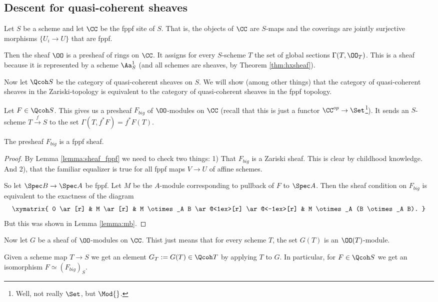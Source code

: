 \documentclass[11pt, english]{article}
\begin{document}
\subsection{Descent for quasi-coherent sheaves}

Let $S$ be a scheme and let $\CC$ be the fppf site of $S$. That is, the objects of $\CC$ are $S$-maps and the coverings are jointly surjective morphisms $\{U_i \to U\}$ that are fppf.

Then the sheaf $\OO$ is a presheaf of rings on $\CC$. It assigns for every $S$-scheme $T$ the set of global sections $\Gamma(T, \OO_T)$. This is a sheaf because it is represented by a scheme $\Aa_S^1$ (and all schemes are sheaves, by Theorem \ref{thm:hxsheaf}). 

Now let $\Qcoh S$ be the category of quasi-coherent sheaves on $S$. We will show (among other things) that the category of quasi-coherent sheaves in the Zariski-topology is equivalent to the category of quasi-coherent sheaves in the fppf topology.

Let $F \in \Qcoh S$. This gives us a presheaf $F_{big}$ of $\OO$-modules on $\CC$ (recall that this is just a functor $\CC^{op} \to \Set$\footnote{Well, not really $\Set$, but $\Mod {}$.}). It sends an $S$-scheme $T \xrightarrow{f} S$ to the set $\Gamma(T,f^\ast F) = f^\ast F(T)$. 

\begin{lemma}
The presheaf $F_{big}$ is a fppf sheaf.
\end{lemma}
\begin{proof}
By Lemma \ref{lemma:sheaf_fppf} we need to check two things: 1) That $F_{big}$ is a Zariski sheaf. This is clear by childhood knowledge. And 2), that the familiar equalizer is true for all fppf maps $V \to U$ of affine schemes. 

So let $\Spec B \to \Spec A$ be fppf. Let $M$ be the $A$-module corresponding to pullback of $F$ to $\Spec A$. Then the sheaf condition on $F_{big}$ is equivalent to the exactness of the diagram
\[
\xymatrix{
0 \ar[r] &  M \ar[r] & M \otimes_A B \ar@<1ex>[r] \ar@<-1ex>[r] & M \otimes_A (B \otimes_A B).
}
\]
But this was shown in Lemma \ref{lemma:mb}.
\end{proof}

Now let $G$ be a sheaf of $\OO$-modules on $\CC$. Thist just means that for every scheme $T$, the set $G(T)$ is an $\OO(T)$-module. 

Given a scheme map $T \to S$ we get an element $G_T := G(T) \in \Qcoh T$ by applying $T$ to $G$. In particular, for $F \in \Qcoh S$ we get an isomorphism $F \simeq (F_{big})_{S}$. 
\end{document}
